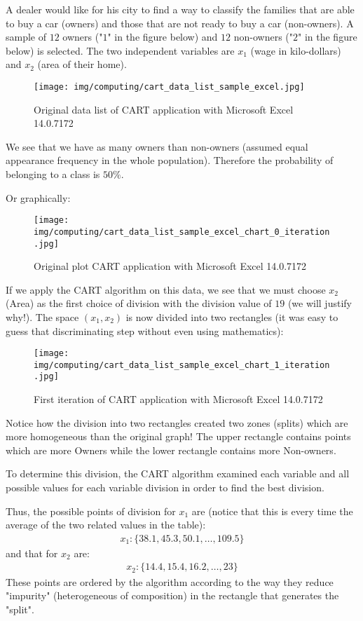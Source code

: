 	A dealer would like for his city to find a way to classify the families that are able to buy a car (owners) and those that are not ready to buy a car (non-owners). A sample of $12$ owners ("$1$" in the figure below) and $12$ non-owners ("$2$" in the figure below) is selected. The two independent variables are $x_1$ (wage in kilo-dollars) and $x_2$ (area of their home).
	
	\begin{figure}[H]
		\centering
		\texttt{[image: img/computing/cart\_data\_list\_sample\_excel.jpg]}
		\caption[]{Original data list of CART application with Microsoft Excel 14.0.7172}
	\end{figure}
	We see that we have as many owners than non-owners (assumed equal appearance frequency in the whole population). Therefore the probability of belonging to a class is $50\%$.

	Or graphically:
	\begin{figure}[H]
		\centering
		\texttt{[image: img/computing/cart\_data\_list\_sample\_excel\_chart\_0\_iteration.jpg]}
		\caption[]{Original  plot CART application with Microsoft Excel 14.0.7172}
	\end{figure}
	If we apply the CART algorithm on this data, we see that we must choose $x_2$ (Area) as the first choice of division with the division value of $19$ (we will justify why!). The space $(x_1,x_2)$ is now divided into two rectangles (it was easy to guess that discriminating step without even using mathematics):
	\begin{figure}[H]
		\centering
		\texttt{[image: img/computing/cart\_data\_list\_sample\_excel\_chart\_1\_iteration.jpg]}
		\caption[]{First iteration of CART application with Microsoft Excel 14.0.7172}
	\end{figure}
	Notice how the division into two rectangles created two zones (splits) which are more homogeneous than the original graph! The upper rectangle contains points which are more Owners while the lower rectangle contains more Non-owners.

	To determine this division, the CART algorithm examined each variable and all possible values for each variable division in order to find the best division.

	Thus, the possible points of division for $x_1$ are (notice that this is every time the average of the two related values in the table):
	\begin{gather*}
		x_1:\{38.1,45.3,50.1,\ldots,109.5\}
	\end{gather*}
	and that for $x_2$ are:
	\begin{gather*}
		x_2:\{14.4,15.4,16.2,\ldots,23\}
	\end{gather*}
	These points are ordered by the algorithm according to the way they reduce "impurity" (heterogeneous of composition) in the rectangle that generates the "split".

